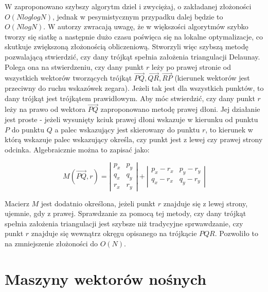 W \cite{Dwyer1987} zaproponowano szybszy algorytm dziel i zwyciężaj, o zakładanej złożoności $O(N log log N)$, jednak w pesymistycznym przypadku dalej będzie
to $O(N log N)$. 
W \cite{jiang2010} autorzy zwracają uwagę, że w większości algorytmów szybko tworzy się siatkę a następnie dużo czasu poświęca się na lokalne optymalizacje,
co skutkuje zwiększoną złożonością obliczeniową. Stworzyli więc szybszą metodę pozwalającą stwierdzić, czy dany trójkąt spełnia założenia triangulacji
Delaunay. Polega ona na stwierdzeniu, czy dany punkt $r$ leży po prawej stronie od wszystkich wektorów tworzących trójkąt $\overrightarrow{PQ}, \overrightarrow{QR}, \overrightarrow{RP}$
(kierunek wektorów jest przeciwny do ruchu wskazówek zegara).
Jeżeli tak jest dla wszystkich punktów, to dany trójkąt jest trójkątem prawidłowym. Aby móc stwierdzić, czy dany punkt $r$ leży na prawo od wektora $\overrightarrow{PQ}$ zaproponowano metodę
prawej dłoni. Jej działanie jest proste - jeżeli wysunięty kciuk prawej dłoni wskazuje w kierunku od punktu $P$ do punktu $Q$ a palec wskazujący jest skierowany
do punktu $r$, to kierunek w którą wskazuje palec wskazujący określa, czy punkt jest z lewej czy prawej strony odcinka. Algebraicznie można to zapisać jako:

\begin{equation}
M(\overrightarrow {PQ},r)=\left\vert
    \begin{matrix}
        p_{x} & p_{y} \\
        q_{x} & q_{y} \\ 
        r_{x} & r_{y} 
    \end{matrix}
    \right\vert +
    \left\vert
    \begin{matrix}
        p_{x}-r_{x} & p_{y}-r_{y} \\
        q_{x}-r_{x} & q_{y}-r_{y} 
    \end{matrix}
    \right\vert
\end{equation}

Macierz $M$ jest dodatnio określona, jeżeli punkt $r$ znajduje się z lewej strony, ujemnie, gdy z prawej. Sprawdzanie za pomocą tej metody, czy dany trójkąt spełnia
założenia triangulacji jest szybsze niż tradycyjne sprwawdzanie, czy punkt $r$ znajduje się wewnątrz okręgu opisanego na trójkącie $PQR$.
Pozwoliło to na zmniejszenie złożoności do $O(N)$.

\section{Maszyny wektorów nośnych}

